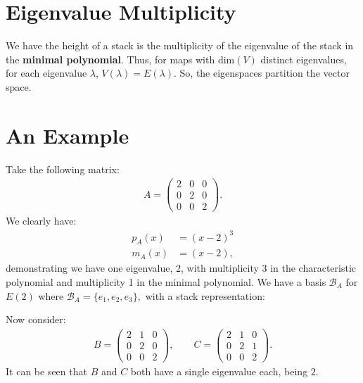 \documentclass[a4paper, 12pt, twoside]{article}
\begin{document}
\section{Eigenvalue Multiplicity}

We have the height of a stack is the multiplicity of the eigenvalue of the stack 
in the \textbf{minimal polynomial}. Thus, for maps with dim$(V)$ distinct eigenvalues,
for each eigenvalue $\lambda$, $V(\lambda) = E(\lambda)$. So, the eigenspaces
partition the vector space.

\newpage

\section{An Example}

Take the following matrix: \begin{gather*}
    A = \begin{pmatrix}
        2 & 0 & 0 \\
        0 & 2 & 0 \\
        0 & 0 & 2
    \end{pmatrix}.
\end{gather*} We clearly have: \begin{align*}
    p_A(x) &= (x - 2)^3 \\
    m_A(x) &= (x - 2),
\end{align*} demonstrating we have one eigenvalue, 2, with multiplicity 3 in the
characteristic polynomial and multiplicity 1 in the minimal polynomial. We have
a basis $\mathcal{B}_A$ for $E(2)$ where $\mathcal{B}_A = \{e_1, e_2, e_3\},$ 
with a stack representation: \begin{center}
\end{center} Now consider: \begin{gather*}
    B = \begin{pmatrix}
        2 & 1 & 0 \\
        0 & 2 & 0 \\
        0 & 0 & 2
    \end{pmatrix}, \qquad
    C = \begin{pmatrix}
        2 & 1 & 0 \\
        0 & 2 & 1 \\
        0 & 0 & 2
    \end{pmatrix}.
\end{gather*} It can be seen that $B$ and $C$ both have a single eigenvalue each, being $2$.
\end{document}
